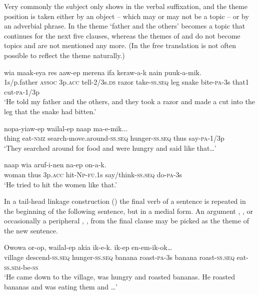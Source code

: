 Very commonly the subject only shows in the verbal suffixation, and the theme position is taken either by an object -- which may or may not be a topic -- or by an adverbial phrase. In  the theme  `father and the others' becomes a topic that continues for the next five clauses, whereas the themes of  and  do not become topics and are not mentioned any more. (In the free translation is not often possible to reflect the theme naturally.)

\ea%
\label{ex:x1909}
\gll {}    wia  maak-eya  res  aaw-ep  merena  ifa  keraw-a-k  nain  puuk-a-mik. \\
1s/p.father  \textsc{assoc}  3p.\textsc{acc}  tell-2/3s.\textsc{ds}  razor  take-\textsc{ss}.\textsc{seq} leg  snake  bite-\textsc{pa}-3s  that1  cut-\textsc{pa}-1/3p     \\
\glt`He told my father and the others, and they took  a razor and made a cut into the leg that the snake had bitten.'
\z


\ea%
\label{ex:x1910}
\gll {}    nopa-yiaw-ep  wailal-ep  naap  ma-e-mik...\\
thing  eat-\textsc{nmz}  search-move.around-\textsc{ss}.\textsc{seq}  hunger-\textsc{ss}.\textsc{seq} thus  say-\textsc{pa}-1/3p      \\
\glt`They searched around for food and were hungry and said like that{\dots}'
\z


\ea%
\label{ex:x1911}
\gll {}  naap  wia  aruf-i-nen  na-ep  on-a-k. \\
woman  thus  3p.\textsc{acc}  hit-\textsc{Np}-\textsc{fu}.1s  say/think-\textsc{ss}.\textsc{seq} do-\textsc{pa}-3s      \\
\glt`He tried to hit the women like that.'
\z


In a tail-head linkage construction () the final verb of a sentence is repeated in the beginning of the following sentence, but in a medial form. An argument , , or occasionally a peripheral , , from the final clause may be picked as the theme of the new sentence.

\ea%
\label{ex:x1912}
\gll Owowa  or-op,  wailal-ep  akia  ik-e-k.   ik-ep  en-em-ik-ok{\dots} \\
village  descend-\textsc{ss}.\textsc{seq}  hunger-\textsc{ss}.\textsc{seq}  banana  roast-\textsc{pa}-3s banana  roast-\textsc{ss}.\textsc{seq}  eat-\textsc{ss}.\textsc{sim}-be-\textsc{ss}     \\
\glt`He came down to the village, was hungry and roasted bananas. He roasted bananas and was eating them and {\dots}'
\z


